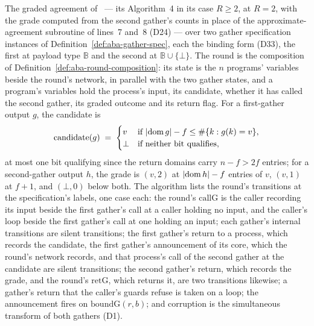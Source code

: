 \begin{definition}
  \label{def:aba-round-over-gather-specifications}
  \leanok
  The graded agreement of~\cite{AFW25} --- its Algorithm~4 in its case $R \ge 2$, at $R = 2$, with the grade computed from the second gather's counts in place of the approximate-agreement subroutine of lines~7 and~8 (D24) --- over two gather specification instances of Definition~\ref{def:aba-gather-spec}, each the binding form (D33), the first at payload type $\mathbb{B}$ and the second at $\mathbb{B} \cup \{\bot\}$.
  The round is the composition of Definition~\ref{def:aba-round-composition}: its state is the $n$ programs' variables beside the round's network, in parallel with the two gather states, and a program's variables hold the process's input, its candidate, whether it has called the second gather, its graded outcome and its return flag.
  For a first-gather output $g$, the candidate is
  \[
    \mathrm{candidate}(g) \;=\;
      \begin{cases}
        v & \text{if } |{\rm dom}\, g| - f \le \#\{k : g(k) = v\},\\
        \bot & \text{if neither bit qualifies,}
      \end{cases}
  \]
  at most one bit qualifying since the return domains carry $n - f > 2f$ entries; for a second-gather output $h$, the grade is $(v, 2)$ at $|{\rm dom}\, h| - f$ entries of $v$, $(v, 1)$ at $f + 1$, and $(\bot, 0)$ below both.
  The algorithm lists the round's transitions at the specification's labels, one case each: the round's $\mathrm{callG}$ is the caller recording its input beside the first gather's call at a caller holding no input, and the caller's loop beside the first gather's call at one holding an input; each gather's internal transitions are silent transitions; the first gather's return to a process, which records the candidate, the first gather's announcement of its core, which the round's network records, and that process's call of the second gather at the candidate are silent transitions; the second gather's return, which records the grade, and the round's $\mathrm{retG}$, which returns it, are two transitions likewise; a gather's return that the caller's guards refuse is taken on a loop; the announcement fires on $\mathrm{boundG}(r,b)$; and corruption is the simultaneous transform of both gathers (D1).

\end{definition}

